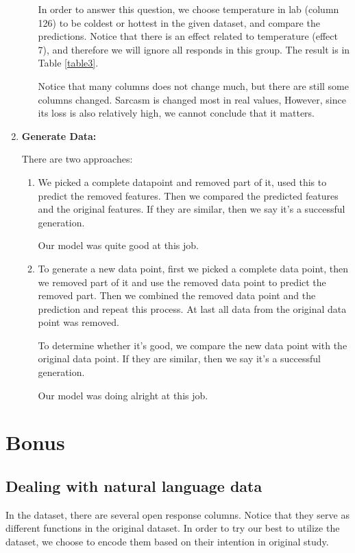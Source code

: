 \documentclass[11pt, a4paper]{article}
\begin{document}
\begin{enumerate}
\begin{itemize}
		\par{In order to answer this question, we choose temperature in lab (column 126) to be coldest or hottest in the given dataset, and compare the predictions. Notice that there is an effect related to temperature (effect 7), and therefore we will ignore all responds in this group. The result is in Table \ref{table3}.
			
			Notice that many columns does not change much, but there are still some columns changed. Sarcasm is changed most in real values, However, since its loss is also relatively high, we cannot conclude that it matters.}
	\end{itemize}
	
	
	
	\item {\textbf{Generate Data:}}
	\par{There are two approaches:}
	\begin{enumerate}
		\item {}
		\par{We picked a complete datapoint and removed part of it, used this to predict the removed features. Then we compared the predicted features and the original features. If they are similar, then we say it's a successful generation. }
		\par{Our model was quite good at this job.}
		\item {}
		\par{To generate a new data point, first we picked a complete data point, then we removed part of it and use the removed data point to predict the removed part. Then we combined the removed data point and the prediction and repeat this process. At last all data from the original data point was removed. }
		\par{To determine whether it's good, we compare the new data point with the original data point. If they are similar, then we say it's a successful generation.}
		\par{Our model was doing alright at this job.}
	\end{enumerate}
\end{enumerate}


\section{Bonus}
\label{sec:Bonus}
\subsection{Dealing with natural language data}
\par{In the dataset, there are several open response columns. Notice that they serve as different functions in the original dataset. In order to try our best to utilize the dataset, we choose to encode them based on their intention in original study.}
\end{document}

